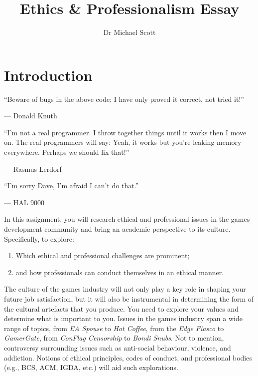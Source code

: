 \documentclass{../../fal_assignment}
\title{Ethics \& Professionalism Essay}
\author{Dr Michael Scott}
\begin{document}
\maketitle

\section*{Introduction}

\begin{marginquote}
  ``Beware of bugs in the above code; I have only proved it correct, not tried it!''
  
   --- Donald Knuth
   
    \marginquoterule
    
    ``I'm not a real programmer. I throw together things until it works then I move on. The real programmers will say: Yeah, it works but you're leaking memory everywhere. Perhaps we should fix that!''
    
    --- Rasmus Lerdorf
    
    \marginquoterule
    
    ``I'm sorry Dave, I'm afraid I can't do that.''
    
    --- HAL 9000
      
\end{marginquote}

In this assignment, you will research ethical and professional issues in the games development community and bring an academic perspective to its culture. Specifically, to explore: 

\begin{enumerate}[label=(\roman*)]
    \item Which ethical and professional challenges are prominent;
    \item and how professionals can conduct themselves in an ethical manner.
\end{enumerate}

The culture of the games industry will not only play a key role in shaping your future job satisfaction, but it will also be instrumental in determining the form of the cultural artefacts that you produce. You need to explore your values and determine what is important to you. Issues in the games industry span a wide range of topics, from \textit{EA Spouse} to \textit{Hot Coffee}, from the \textit{Edge Fiasco} to \textit{GamerGate}, from \textit{ConFlag Censorship} to \textit{Bondi Snubs}. Not to mention, controversy surrounding issues such as anti-social behaviour, violence, and addiction. Notions of ethical principles, codes of conduct, and professional bodies (e.g., BCS, ACM, IGDA, etc.) will aid such explorations. 
\end{document}
